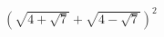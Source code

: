\begin{ex}[type=expression]
	\begin{condition}
		\( (\sqrt{4+\sqrt{7}}+\sqrt{4-\sqrt{7}})^2 \)
	\end{condition}
\end{ex}